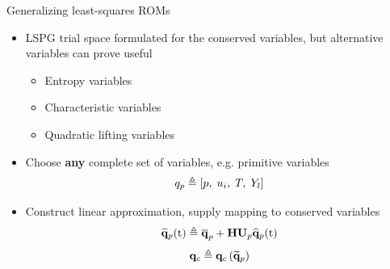 \documentclass[]{beamer}
\begin{document}
\begin{frame}{Generalizing least-squares ROMs}
    \begin{itemize}
		\item LSPG trial space formulated for the conserved variables, but alternative variables can prove useful
		\begin{itemize}
			\item Entropy variables
			\item Characteristic variables
			\item Quadratic lifting variables
		\end{itemize}
		\item Choose \textbf{any} complete set of variables, e.g. primitive variables
		\begin{equation*}
			q_p \triangleq \left[ p, \; u_i, \; T, \; Y_l \right]
		\end{equation*}
		\item Construct linear approximation, supply mapping to conserved variables
		\begin{equation*}
			\primVecRom(\timeVar) \triangleq \primVecCent + \primScale \primTrial \primVecCoef(\timeVar)
		\end{equation*}
		\begin{equation*}
			\mathbf{q}_c \triangleq \mathbf{q}_c \left( \mathbf{\widetilde{q}}_p \right)
		\end{equation*}
	\end{itemize}
\end{frame}
\end{document}
